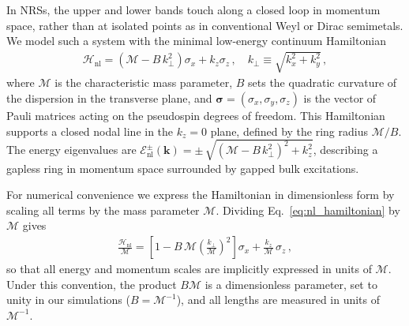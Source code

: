 \documentclass[aps,prb,onecolumn,longbibliography,nofootinbib,citeautoscript,10pt]{revtex4-2}
\begin{document}
In NRSs, the upper and lower bands touch along a closed loop in momentum space, rather than at isolated points as in conventional Weyl or Dirac semimetals. We model such a system with the minimal low-energy continuum Hamiltonian~\cite{Khokhlov2018, fang2012multi}
\begin{align}
\mathcal{H}_{\text{nl}} = \left(\mathcal{M} - B \, k_{\perp}^{2}\right) \sigma_{x} + k_z \sigma_{z} \,, 
\quad k_{\perp} \equiv \sqrt{ k_x^2 + k_y^2}\,,
\label{eq:nl_hamiltonian}
\end{align}
where $\mathcal{M}$ is the characteristic mass parameter, $B$ sets the quadratic curvature of the dispersion in the transverse plane, and $\bm{\sigma} = (\sigma_x, \sigma_y, \sigma_z)$ is the vector of Pauli matrices acting on the pseudospin degrees of freedom. This Hamiltonian supports a closed nodal line in the $k_z = 0$ plane, defined by the ring radius $  \mathcal{M}/B$. The energy eigenvalues are $\mathcal{E}^{\pm}_{\text{nl}}(\boldsymbol{k}) = \pm \,\sqrt{\left(\mathcal{M} - B \, k_{\perp}^{2}\right)^2 + k_z^2}$, describing a gapless ring in momentum space surrounded by gapped bulk excitations.

For numerical convenience we express the Hamiltonian in dimensionless form by scaling all terms by the mass parameter $\mathcal{M}$. Dividing Eq.~\eqref{eq:nl_hamiltonian} by $\mathcal{M}$ gives
\begin{align}
\frac{\mathcal{H}_{\text{nl}}} {\mathcal{M}} 
= \left[1 - B\, \mathcal{M} \left(\frac{k_{\perp}} {\mathcal{M}}\right)^2\right]
 \sigma_{x} + \frac{k_z} {\mathcal{M}} \, \sigma_{z} \,, 
\end{align}
so that all energy and momentum scales are implicitly expressed in units of $\mathcal{M}$. Under this convention, the product $B\mathcal{M}$ is a dimensionless parameter, set to unity in our simulations ($B = \mathcal{M}^{-1}$), and all lengths are measured in units of $\mathcal{M}^{-1}$.
\end{document}
